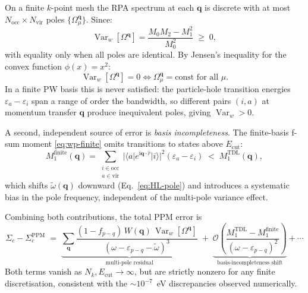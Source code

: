 \documentclass[11pt]{article}
\newcommand{\bq}{\mathbf{q}}
\newcommand{\wt}{\tilde{\omega}}
\newcommand{\Om}{\Omega}
\newcommand{\eps}{\varepsilon}
\newcommand{\Sig}{\Sigma}
\newcommand{\ii}{\mathrm{i}}
\begin{document}
On a finite $k$-point mesh the RPA spectrum at each $\bq$ is discrete
with at most $N_\text{occ}\times N_\text{vir}$ poles $\{\Om_\mu^\bq\}$.
Since:
\begin{equation}
  \operatorname{Var}_w[\Om^\bq]
  = \frac{M_0 M_2 - M_1^2}{M_0^2}
  \;\geq\; 0,
  \label{eq:var-finite}
\end{equation}
with equality only when all poles are identical.
By Jensen's inequality for the convex function $\phi(x)=x^2$:
\begin{equation}
  \operatorname{Var}_w[\Om^\bq] = 0
  \iff \Om_\mu^\bq = \text{const for all }\mu.
\end{equation}
In a finite PW basis this is never satisfied: the particle-hole
transition energies $\eps_a-\eps_i$ span a range of order the bandwidth,
so different pairs $(i,a)$ at momentum transfer $\bq$ produce
inequivalent poles, giving $\operatorname{Var}_w > 0$.

A second, independent source of error is \emph{basis incompleteness}.
The finite-basis f-sum moment \eqref{eq:wp-finite} omits transitions to
states above $E_\text{cut}$:
\begin{equation}
  M_1^\text{finite}(\bq)
  = \sum_{\substack{i\in\text{occ}\\a\in\text{vir}}}
    |\langle a|e^{\ii\bq\cdot\hat r}|i\rangle|^2(\eps_a-\eps_i)
  \;<\; M_1^\text{TDL}(\bq),
  \label{eq:fsum-incomplete}
\end{equation}
which shifts $\wt(\bq)$ downward (Eq.~\eqref{eq:HL-pole}) and introduces
a systematic bias in the pole frequency, independent of the multi-pole
variance effect.

Combining both contributions, the total PPM error is
\begin{equation}
  \Sig_c - \Sig_c^\text{PPM}
  \;=\;
  \underbrace{
    \sum_\bq
    \frac{(1-f_{p-q})\,W(\bq)\,\operatorname{Var}_w[\Om^\bq]}
         {(\omega-\eps_{p-q}-\wt)^3}
  }_{\text{multi-pole residual}}
  \;+\;
  \underbrace{
    \mathcal{O}\!\left(
      \frac{M_1^\text{TDL}-M_1^\text{finite}}
           {(\omega-\eps_{p-q})^2}
    \right)
  }_{\text{basis-incompleteness shift}}
  + \cdots
  \label{eq:total-error}
\end{equation}
Both terms vanish as $N_k,E_\text{cut}\to\infty$, but are strictly
nonzero for any finite discretisation, consistent with the
$\sim 10^{-7}$~eV discrepancies observed numerically.
\end{document}
